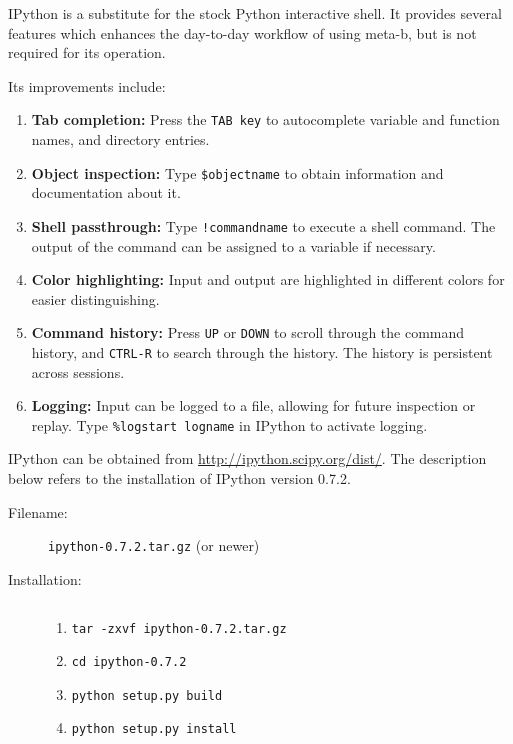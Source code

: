 IPython is a substitute for the stock Python interactive shell. It
provides several features which enhances the day-to-day workflow of
using meta-b, but is not required for its operation.

Its improvements include:
\begin{enumerate}
    \item {\bf Tab completion:} Press the {\tt TAB key} to autocomplete
          variable and function names, and directory entries.
    \item {\bf Object inspection:} Type {\tt \$objectname} to obtain
          information and documentation about it.
    \item {\bf Shell passthrough:} Type {\tt !commandname} to execute a
          shell command. The output of the command can be assigned to a
          variable if necessary.
    \item {\bf Color highlighting:} Input and output are highlighted in
          different colors for easier distinguishing.
    \item {\bf Command history:} Press {\tt UP} or {\tt DOWN} to scroll through the
          command history, and {\tt CTRL-R} to search through the history. The
          history is persistent across sessions.
    \item {\bf Logging:} Input can be logged to a file, allowing for
          future inspection or replay. Type {\tt \%logstart logname}
          in IPython to activate logging.
\end{enumerate}

IPython can be obtained from \url{http://ipython.scipy.org/dist/}. The
description below refers to the installation of IPython version 0.7.2.

\begin{description}
\item [Filename:] {\tt ipython-0.7.2.tar.gz} (or newer)
\item [Installation:] $ $
  \begin{enumerate}
  \item {\tt tar -zxvf ipython-0.7.2.tar.gz}
  \item {\tt cd ipython-0.7.2}
  \item {\tt python setup.py build}
  \item {\tt python setup.py install}
  \end{enumerate}
\end{description}
